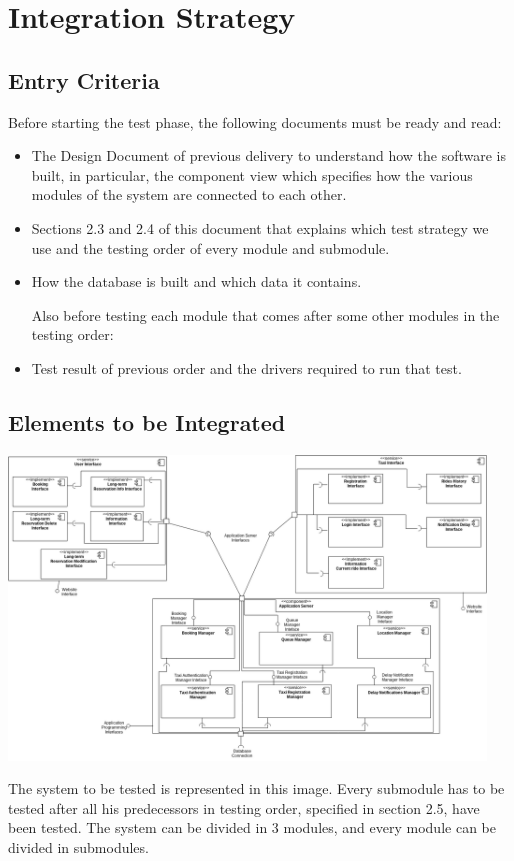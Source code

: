 \section{Integration Strategy}
\subsection{Entry Criteria}
	Before starting the test phase, the following documents must be ready and read:
	\begin{itemize}
		\item The Design Document of previous delivery to understand how the software is built, in particular, the component view which specifies how the various modules of the system are connected to each other.
		\item Sections 2.3 and 2.4 of this document that explains which test strategy we use and the testing order of every module and submodule.
		\item How the database is built and which data it contains.
		
		Also before testing each module that comes after some other modules in the testing order:
		
		\item Test result of previous order and the drivers required to run that test.
	\end{itemize} 
\subsection{Elements to be Integrated}
		\begin{center}
			\includegraphics[width=0.95\textwidth]{./images/test_modules.png}
		\end{center}
		The system to be tested is represented in this image. Every submodule has to be tested after all his predecessors in testing order, specified in section 2.5, have been tested. The system can be divided in 3 modules, and every module can be divided in submodules.
